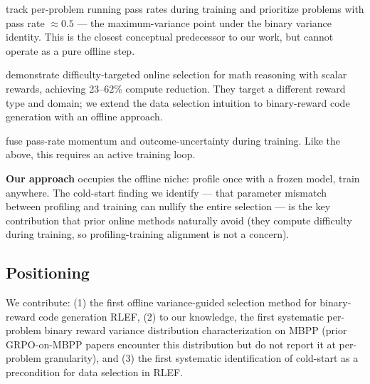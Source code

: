 \citet{Baroian2026PromptReplay} track per-problem running pass rates during training and prioritize problems with pass rate $\approx 0.5$ --- the maximum-variance point under the binary variance identity. This is the closest conceptual predecessor to our work, but cannot operate as a pure offline step.

\citet{Sun2025DataEfficiency} demonstrate difficulty-targeted online selection for math reasoning with scalar rewards, achieving 23--62\% compute reduction. They target a different reward type and domain; we extend the data selection intuition to binary-reward code generation with an offline approach.

\citet{Cui2026LZE} fuse pass-rate momentum and outcome-uncertainty during training. Like the above, this requires an active training loop.

\textbf{Our approach} occupies the offline niche: profile once with a frozen model, train anywhere. The cold-start finding we identify --- that parameter mismatch between profiling and training can nullify the entire selection --- is the key contribution that prior online methods naturally avoid (they compute difficulty during training, so profiling-training alignment is not a concern).

\subsection{Positioning}

We contribute: (1) the first offline variance-guided selection method for binary-reward code generation RLEF, (2) to our knowledge, the first systematic per-problem binary reward variance distribution characterization on MBPP (prior GRPO-on-MBPP papers encounter this distribution but do not report it at per-problem granularity), and (3) the first systematic identification of cold-start as a precondition for data selection in RLEF.
